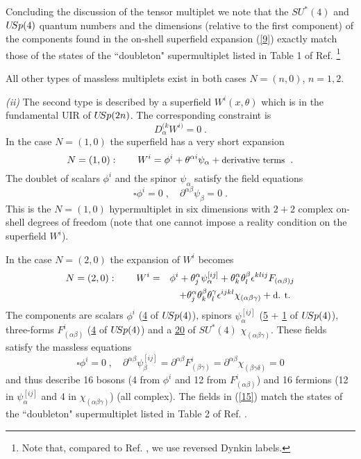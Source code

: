 \documentclass[a4paper,12pt]{article}
\begin{document}
Concluding the discussion of the tensor multiplet we note that the 
$SU^*(4)$ and $U\hskip-2pt Sp(4)$ quantum numbers and the 
dimensions (relative to the first component) of the components 
found in the on-shell superfield expansion (\ref{9}) exactly match 
those of the states of the ``doubleton" supermultiplet listed in 
Table 1 of Ref. \cite{GT} \footnote{Note that, compared to Ref. \cite{GT}, we
use reversed Dynkin labels.}
 


All other types of massless multiplets exist in both cases 
$N=(n,0)$, $n=1,2$. 


{\sl (ii)} The second type is described by a superfield 
$W^i(x,\theta)$ which is in the fundamental UIR of $U\hskip-2pt 
Sp(2n)$. The corresponding constraint is 
\begin{equation}\label{12}
  D^{(k}_\alpha W^{i)}=0\;.
\end{equation}
In the case $N=(1,0)$ the superfield has a very short expansion
\begin{equation}\label{13}
N=(1,0):\qquad   W^i = \phi^i + \theta^{\alpha i}\psi_\alpha + 
\mbox{\small derivative terms }\;. 
\end{equation}
The doublet of scalars $\phi^i$ and the spinor $\psi_\alpha$ 
satisfy the field equations
\begin{equation}\label{14}
  \square\phi^{i} = 0\;, \quad 
\partial^{\alpha\beta}\psi_\beta = 0\;.
\end{equation}
This is the $N=(1,0)$ hypermultiplet \cite{Sohnius} in  six 
dimensions with $2+2$ complex on-shell degrees of freedom (note 
that one cannot impose a reality condition on the superfield 
$W^i$). 


In the case $N=(2,0)$ the expansion of $W^i$ becomes
\begin{eqnarray}
  N=(2,0): \qquad W^i &=&   \phi^i + \theta^{\alpha }_j\psi^{[ij]}_\alpha 
 + \theta^\alpha_k \theta^\beta_l \epsilon^{klij}  F_{(\alpha\beta)j} \nonumber\\
  && + \theta^\alpha_j \theta^\beta_k \theta^\gamma_l 
\epsilon^{ijkl}\chi_{(\alpha\beta\gamma)} + \mbox{\small d. t. } 
\label{15} 
\end{eqnarray}
The components are scalars $\phi^i$ ({\underline 4 } of 
$U\hskip-2pt Sp(4)$), spinors $\psi^{[ij]}_\alpha$ ({\underline 
{5} + \underline {1}} of $U\hskip-2pt Sp(4)$), three-forms 
$F^i_{(\alpha\beta)}$ ({\underline 4} of $U\hskip-2pt Sp(4)$) and 
a \underline{20} of $SU^*(4)$ $\chi_{(\alpha\beta\gamma)}$. These 
fields satisfy the massless equations 
\begin{equation}\label{16}
 \square\phi^{i} = 0\;, \quad 
\partial^{\alpha\beta}\psi^{[ij]}_\beta = 
\partial^{\alpha\beta}F^i_{(\beta\gamma)} =
\partial^{\alpha\beta}\chi_{(\beta\gamma\delta)} = 0
\end{equation}
and thus describe 16 bosons (4 from $\phi^i$ and 12 from 
$F^i_{(\alpha\beta)}$) and 16 fermions (12 in $\psi^{[ij]}_\alpha$ 
and 4 in $\chi_{(\alpha\beta\gamma)}$) (all complex). The fields 
in (\ref{15}) match the states of the ``doubleton" supermultiplet 
listed in Table 2 of Ref. \cite{GT}. 
 
\end{document}
